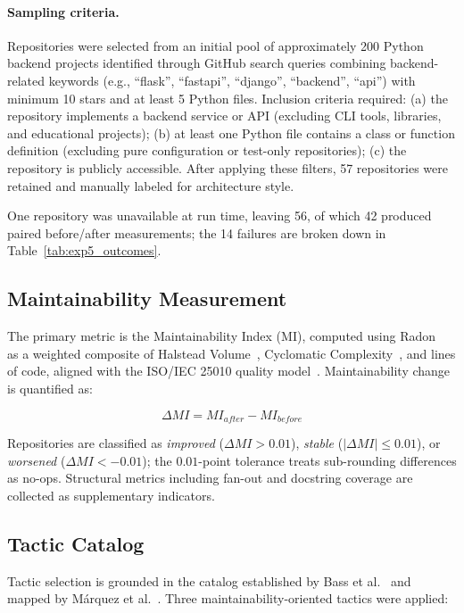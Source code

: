 \documentclass[runningheads]{llncs}
\begin{document}
\paragraph{Sampling criteria.}
Repositories were selected from an initial pool of approximately 200 Python backend projects identified through GitHub search queries combining backend-related keywords (e.g., ``flask'', ``fastapi'', ``django'', ``backend'', ``api'') with minimum 10 stars and at least 5 Python files. Inclusion criteria required: (a) the repository implements a backend service or API (excluding CLI tools, libraries, and educational projects); (b) at least one Python file contains a class or function definition (excluding pure configuration or test-only repositories); (c) the repository is publicly accessible. After applying these filters, 57 repositories were retained and manually labeled for architecture style.

One repository was unavailable at run time, leaving 56, of which 42 produced paired before/after measurements; the 14 failures are broken down in Table~\ref{tab:exp5_outcomes}.

\subsection{Maintainability Measurement}

The primary metric is the Maintainability Index (MI), computed using Radon~\cite{oman1992maintainability} as a weighted composite of Halstead Volume~\cite{halstead1977elements}, Cyclomatic Complexity~\cite{mccabe1976complexity}, and lines of code, aligned with the ISO/IEC 25010 quality model~\cite{ISO25010}. Maintainability change is quantified as:

\begin{equation}
\Delta MI = MI_{after} - MI_{before}
\end{equation}

Repositories are classified as \textit{improved} ($\Delta MI > 0.01$), \textit{stable} ($|\Delta MI| \le 0.01$), or \textit{worsened} ($\Delta MI < -0.01$); the $0.01$-point tolerance treats sub-rounding differences as no-ops. Structural metrics including fan-out and docstring coverage are collected as supplementary indicators.

\subsection{Tactic Catalog}

Tactic selection is grounded in the catalog established by Bass et al.~\cite{bass2021software} and mapped by M\'arquez et al.~\cite{marquez2022architectural}. Three maintainability-oriented tactics were applied:
\end{document}
